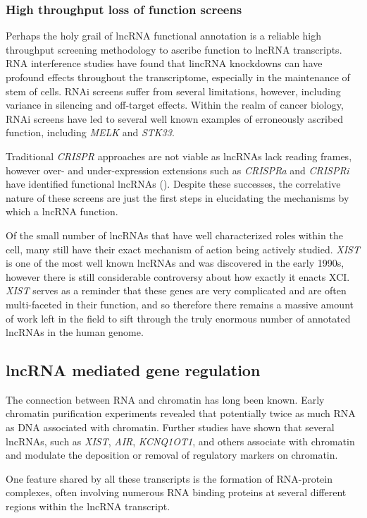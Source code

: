 \subsubsection{High throughput loss of function screens}
Perhaps the holy grail of lncRNA functional annotation is a reliable high throughput screening methodology to ascribe function to lncRNA transcripts. RNA interference studies have found that lincRNA knockdowns can have profound effects throughout the transcriptome, especially in the maintenance of stem of cells. RNAi screens suffer from several limitations, however, including variance in silencing and off-target effects. Within the realm of cancer biology, RNAi screens have led to several well known examples of erroneously ascribed function, including \emph{MELK} and \emph{STK33}.

Traditional \emph{CRISPR} approaches are not viable as lncRNAs lack reading frames, however over- and under-expression extensions such as \emph{CRISPRa} and \emph{CRISPRi} have identified functional lncRNAs (\citep{Cai2020AHomeostasis}). Despite these successes, the correlative nature of these screens are just the first steps in elucidating the mechanisms by which a lncRNA function. 

Of the small number of lncRNAs that have well characterized roles within the cell, many still have their exact mechanism of action being actively studied. \emph{XIST} is one of the most well known lncRNAs and was discovered in the early 1990s, however there is still considerable controversy about how exactly it enacts XCI. \emph{XIST} serves as a reminder that these genes are very complicated and are often multi-faceted in their function, and so therefore there remains a massive amount of work left in the field to sift through the truly enormous number of annotated lncRNAs in the human genome.

\subsection{lncRNA mediated gene regulation}

The connection between RNA and chromatin has long been known. Early chromatin purification experiments revealed that potentially twice as much RNA as DNA associated with chromatin. Further studies have shown that several lncRNAs, such as \emph{XIST}, \emph{AIR}, \emph{KCNQ1OT1}, and others associate with chromatin and modulate the deposition or removal of regulatory markers on chromatin. 

One feature shared by all these transcripts is the formation of RNA-protein complexes, often involving numerous RNA binding proteins at several different regions within the lncRNA transcript. 


